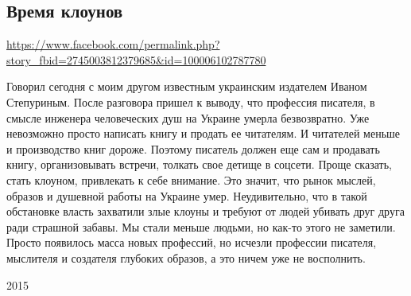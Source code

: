  
 
 
 
 

\subsection{Время клоунов}
\url{https://www.facebook.com/permalink.php?story_fbid=2745003812379685&id=100006102787780}

Говорил сегодня с моим другом известным украинским издателем Иваном Степуриным.
После разговора пришел к выводу, что профессия писателя, в смысле инженера
человеческих душ на Украине умерла безвозвратно. Уже невозможно просто написать
книгу и продать ее читателям. И читателей меньше и производство книг дороже.
Поэтому писатель должен еще сам и продавать книгу, организовывать встречи,
толкать свое детище в соцсети. Проще сказать, стать клоуном, привлекать к себе
внимание. Это значит, что рынок мыслей, образов и душевной работы на Украине
умер. Неудивительно, что в такой обстановке власть захватили злые клоуны и
требуют от людей убивать друг друга ради страшной забавы. Мы стали меньше
людьми, но как-то этого не заметили. Просто появилось масса новых профессий, но
исчезли профессии писателя, мыслителя и создателя глубоких образов, а это ничем
уже не восполнить.  

2015
